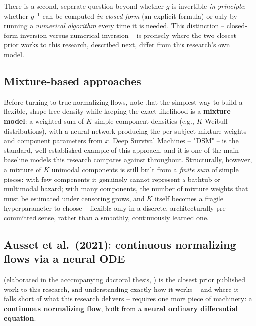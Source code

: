 \documentclass[11pt]{article}
\begin{document}
There is a second, separate question beyond whether $g$ is invertible
\emph{in principle}: whether $g^{-1}$ can be computed \emph{in closed
form} (an explicit formula) or only by running a \emph{numerical
algorithm} every time it is needed. This distinction -- closed-form
inversion versus numerical inversion -- is precisely where the two
closest prior works to this research, described next, differ from this
research's own model.

\subsection{Mixture-based approaches}
Before turning to true normalizing flows, note that the simplest way to
build a flexible, shape-free density while keeping the exact likelihood
is a \textbf{mixture model}: a weighted sum of $K$ simple component
densities (e.g., $K$ Weibull distributions), with a neural network
producing the per-subject mixture weights and component parameters from
$x$. Deep Survival Machines \citep{nagpal2022dsm} -- "DSM" -- is the
standard, well-established example of this approach, and it is one of
the main baseline models this research compares against throughout.
Structurally, however, a mixture of $K$ unimodal components is still
built from a \emph{finite sum} of simple pieces: with few components it
genuinely cannot represent a bathtub or multimodal hazard; with many
components, the number of mixture weights that must be estimated under
censoring grows, and $K$ itself becomes a fragile hyperparameter to
choose -- flexible only in a discrete, architecturally pre-committed
sense, rather than a smoothly, continuously learned one.

\subsection{Ausset et al.\ (2021): continuous normalizing flows via a neural ODE}
\label{sec:ausset}

\citet{ausset2021flows} (elaborated in the accompanying doctoral thesis,
\citealp{ausset2021thesis}) is the closest prior published work to this
research, and understanding exactly how it works -- and where it falls
short of what this research delivers -- requires one more piece of
machinery: a \textbf{continuous normalizing flow}, built from a
\textbf{neural ordinary differential equation}.
\end{document}
